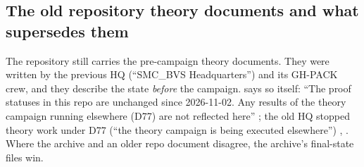 \subsection{The old repository theory documents and what supersedes them}\label{sec:history:olddocs}

The repository still carries the pre-campaign theory documents. They were written by the previous HQ (``SMC\_BVS Headquarters'') and its GH-PACK crew, and they describe the state \emph{before} the campaign.  says so itself: ``The proof statuses in this repo are unchanged since 2026-11-02. Any results of the theory campaign running elsewhere (D77) are not reflected here'' ; the old HQ stopped theory work under D77 (``the theory campaign is being executed elsewhere'') , . Where the archive and an older repo document disagree, the archive's final-state files win.

